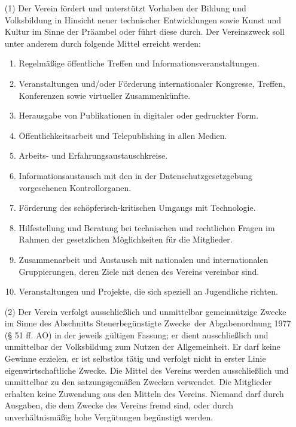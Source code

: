 \documentclass[12pt,paper=a4,ngerman]{scrreprt}
\begin{document}
\begin{itemize}
\item[(1)]
Der Verein fördert und unterstützt Vorhaben der Bildung und
Volksbildung in Hinsicht neuer technischer Entwicklungen sowie Kunst
und Kultur im Sinne der Präambel oder führt diese durch. Der
Vereinszweck soll unter anderem durch folgende Mittel erreicht
werden:
\begin{enumerate}
\item
Regelmäßige öffentliche Treffen und Informationsveranstaltungen.
\item
Veranstaltungen und/oder Förderung internationaler Kongresse, Treffen,
Konferenzen sowie virtueller Zusammenkünfte.
\item
Herausgabe von Publikationen in digitaler oder gedruckter Form.
\item
Öffentlichkeitsarbeit und Telepublishing in allen Medien.
\item
Arbeits- und Erfahrungsaustauschkreise.
\item
Informationsaustausch mit den in der Datenschutzgesetzgebung
vorgesehenen Kontrollorganen.
\item
Förderung des schöpferisch-kritischen Umgangs mit Technologie.
\item
Hilfestellung und Beratung bei technischen und rechtlichen Fragen im
Rahmen der gesetzlichen Möglichkeiten für die Mitglieder.
\item
Zusammenarbeit und Austausch mit nationalen und internationalen
Gruppierungen, deren Ziele mit denen des Vereins vereinbar sind.
\item
Veranstaltungen und Projekte, die sich speziell an Jugendliche richten.
\end{enumerate}
\item[(2)]
Der Verein verfolgt ausschließlich und unmittelbar gemeinnützige
Zwecke im Sinne des Abschnitts \glqq Steuerbegünstigte Zwecke\grqq\
der Abgabenordnung 1977 (§ 51 ff. AO) in der jeweils gültigen
Fassung; er dient ausschließlich und unmittelbar der Volksbildung zum
Nutzen der Allgemeinheit. Er darf keine Gewinne erzielen, er ist
selbstlos tätig und verfolgt nicht in erster Linie
eigenwirtschaftliche Zwecke. Die Mittel des Vereins werden
ausschließlich und unmittelbar zu den satzungsgemäßen Zwecken
verwendet. Die Mitglieder erhalten keine Zuwendung aus den Mitteln des
Vereins. Niemand darf durch Ausgaben, die dem Zwecke des Vereins fremd sind,
oder durch unverhältnismäßig hohe Vergütungen begünstigt werden.
\end{itemize}
\end{document}
